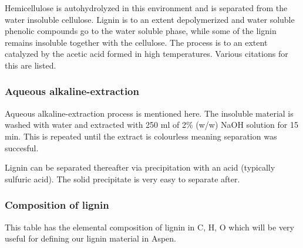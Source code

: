 \documentclass[11pt]{article}
\begin{document}
Hemicellulose is autohydrolyzed in this environment and is separated from the water insoluble cellulose. Lignin is to an extent depolymerized and water soluble phenolic compounds go to the water soluble phase, while some of the lignin remains insoluble together with the cellulose. The process is to an extent catalyzed by the acetic acid formed in high temperatures. Various citations for this are listed.
\subsubsection{Aqueous alkaline-extraction}
\label{sec:orgf17030c}
Aqueous alkaline-extraction process is mentioned here. The insoluble material is washed with water and extracted with 250 ml of 2\% (w/w) NaOH solution for 15 min. This is repeated until the extract is colourless meaning separation was succesful.

Lignin can be separated thereafter via precipitation with an acid (typically sulfuric acid). The solid precipitate is very easy to separate after.
\subsubsection{Composition of lignin}
\label{sec:org9bcb9d0}
This table has the elemental composition of lignin in C, H, O which will be very useful for defining our lignin material in Aspen.
\end{document}

